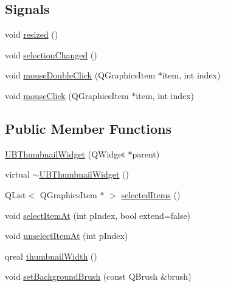 \subsection*{Signals}
\begin{DoxyCompactItemize}
\item 
void \hyperlink{class_u_b_thumbnail_widget_a968ec9aea69c013f6c2d06bf5a2cd532}{resized} ()
\item 
void \hyperlink{class_u_b_thumbnail_widget_ad87147e17c83d148d7d132cae34f886a}{selection\-Changed} ()
\item 
void \hyperlink{class_u_b_thumbnail_widget_a54171b2e9bf1ec969229782fbe3a5b3a}{mouse\-Double\-Click} (Q\-Graphics\-Item $\ast$item, int index)
\item 
void \hyperlink{class_u_b_thumbnail_widget_ac625ea33a0163e3af34f4f98d9de3291}{mouse\-Click} (Q\-Graphics\-Item $\ast$item, int index)
\end{DoxyCompactItemize}
\subsection*{Public Member Functions}
\begin{DoxyCompactItemize}
\item 
\hyperlink{class_u_b_thumbnail_widget_ac6aeee1050bfa0a5b6931da8eae826fb}{U\-B\-Thumbnail\-Widget} (Q\-Widget $\ast$parent)
\item 
virtual \hyperlink{class_u_b_thumbnail_widget_ae2aa7cbac97738fdb573eef1bd576b69}{$\sim$\-U\-B\-Thumbnail\-Widget} ()
\item 
Q\-List$<$ Q\-Graphics\-Item $\ast$ $>$ \hyperlink{class_u_b_thumbnail_widget_a2ab6d6162aac89e9656d63aa358cdd20}{selected\-Items} ()
\item 
void \hyperlink{class_u_b_thumbnail_widget_ad8826d4cf4305cbfc37ef4316f80cb04}{select\-Item\-At} (int p\-Index, bool extend=false)
\item 
void \hyperlink{class_u_b_thumbnail_widget_a5a6f76d39698a4f7f08ee77fd0213a62}{unselect\-Item\-At} (int p\-Index)
\item 
qreal \hyperlink{class_u_b_thumbnail_widget_a34c03c4d7392e1f668535ca539e0f98e}{thumbnail\-Width} ()
\item 
void \hyperlink{class_u_b_thumbnail_widget_afcc16399008cda7ebbe4cb679356ce36}{set\-Background\-Brush} (const Q\-Brush \&brush)
\end{DoxyCompactItemize}
